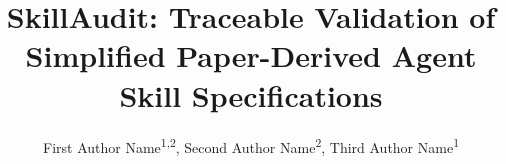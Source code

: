 \documentclass[letterpaper]{article} %
\title{SkillAudit: Traceable Validation of Simplified Paper-Derived Agent Skill Specifications}
\author {
    First Author Name\textsuperscript{\rm 1,\rm 2}\equalcontrib,
    Second Author Name\textsuperscript{\rm 2}\equalcontrib,
    Third Author Name\textsuperscript{\rm 1}\corresponding
}
\begin{document}
\maketitle











\ifdefined\IncludeAppendix

\fi

% 
\end{document}
